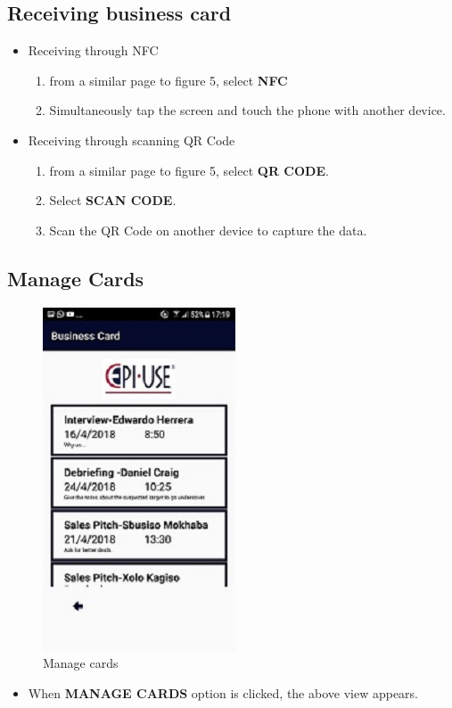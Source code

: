 \documentclass[english]{article}
\begin{document}
\subsection{Receiving business card}
	\begin{itemize}
		\item Receiving through NFC
		\begin{enumerate}
			\item from a similar page to figure 5, select \textbf{NFC}
			\item Simultaneously tap the screen and touch the phone with another device.
		\end{enumerate}
		\item Receiving through scanning QR Code
		\begin{enumerate}
			\item from a similar page to figure 5, select \textbf{QR CODE}.  
			\item Select \textbf{SCAN CODE}.
			\item Scan the QR Code on another device to capture the data.
		\end{enumerate}
	\end{itemize}
\subsection{Manage Cards}
		\begin{figure}[H]
			\centering
			\includegraphics[scale=0.3]{Manage_Card.jpg}
			\caption{Manage cards}
			\label{figure: 6}
		\end{figure}
		\begin{itemize}
			\item When \textbf{MANAGE CARDS} option is clicked, the above view appears. 
		\end{itemize}
		
\end{document}

